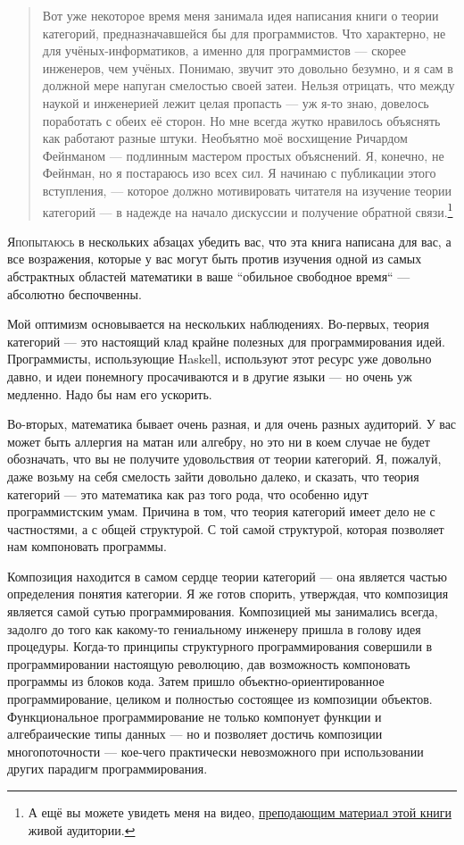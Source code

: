 \begin{quote}
Вот уже некоторое время меня занимала идея написания книги о теории категорий,
предназначавшейся бы для программистов. Что характерно, не для учёных-информатиков,
а именно для программистов --- скорее инженеров, чем учёных. Понимаю, звучит это
довольно безумно, и я сам в должной мере напуган смелостью своей затеи. Нельзя отрицать,
что между наукой и инженерией лежит целая пропасть — уж я-то знаю, довелось поработать
с обеих её сторон. Но мне всегда жутко нравилось объяснять как работают разные штуки.
Необъятно моё восхищение Ричардом Фейнманом — подлинным мастером простых объяснений.
Я, конечно, не Фейнман, но я постараюсь изо всех сил.
Я начинаю с публикации этого вступления,
--- которое должно мотивировать читателя на изучение теории категорий
--- в надежде на начало дискуссии и получение обратной связи.\footnote{
    А ещё вы можете увидеть меня на видео, \href{https://www.youtube.com/playlist?list=PLbgaMIhjbmEnaH_LTkxLI7FMa2HsnawM_}{преподающим
    материал этой книги} живой аудитории.}
\end{quote}

\lettrine[lhang=0.17]{Я}{попытаюсь} в нескольких абзацах
убедить вас, что эта книга написана для вас, а все возражения, которые
у вас могут быть против изучения одной из самых абстрактных областей математики
в ваше ``обильное свободное время`` — абсолютно беспочвенны.

Мой оптимизм основывается на нескольких наблюдениях. Во-первых, теория категорий —
это настоящий клад крайне полезных для программирования идей. Программисты, использующие
Haskell, используют этот ресурс уже довольно давно, и идеи понемногу просачиваются
и в другие языки — но очень уж медленно. Надо бы нам его ускорить.

Во-вторых, математика бывает очень разная, и для очень разных аудиторий.
У вас может быть аллергия на матан или алгебру, но это ни в коем случае не
будет обозначать, что вы не получите удовольствия от теории категорий.
Я, пожалуй, даже возьму на себя смелость зайти довольно далеко, и сказать,
что теория категорий — это математика как раз того рода, что особенно идут
программистским умам. Причина в том, что теория категорий имеет дело не с
частностями, а с общей структурой. С той самой структурой, которая
позволяет нам компоновать программы.

Композиция находится в самом сердце теории категорий --- она является частью
определения понятия категории. Я же готов спорить, утверждая, что композиция
является самой сутью программирования. Композицией мы занимались всегда, задолго
до того как какому-то гениальному инженеру пришла в голову идея процедуры.
Когда-то принципы структурного программирования совершили в программировании
настоящую революцию, дав возможность компоновать программы из блоков кода.
Затем пришло объектно-ориентированное программирование, целиком и полностью
состоящее из композиции объектов. Функциональное программирование не только
компонует функции и алгебраические типы данных --- но и позволяет достичь
композиции многопоточности --- кое-чего практически невозможного при использовании
других парадигм программирования.


